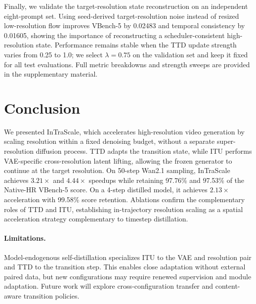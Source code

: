 \documentclass[letterpaper]{article} %
\begin{document}
Finally, we validate the target-resolution state reconstruction on an
independent eight-prompt set. Using seed-derived target-resolution noise
instead of resized low-resolution flow improves VBench-5 by 0.02483 and
temporal consistency by 0.01605, showing the importance of reconstructing a
scheduler-consistent high-resolution state. Performance remains stable when
the TTD update strength varies from 0.25 to 1.0; we select
\(\lambda=0.75\) on the validation set and keep it fixed for all test
evaluations. Full metric breakdowns and strength sweeps are provided in the
supplementary material.

\section{Conclusion}

We presented InTraScale, which accelerates high-resolution video generation
by scaling resolution within a fixed denoising budget, without a separate
super-resolution diffusion process. TTD adapts the transition state, while
ITU performs VAE-specific cross-resolution latent lifting, allowing the
frozen generator to continue at the target resolution. On 50-step
Wan2.1 sampling, InTraScale achieves \(3.21\times\) and \(4.44\times\)
speedups while retaining 97.76\% and 97.53\% of the Native-HR
VBench-5 score. On a 4-step distilled model, it achieves
\(2.13\times\) acceleration with 99.58\% score retention. Ablations confirm
the complementary roles of TTD and ITU, establishing in-trajectory resolution
scaling as a spatial acceleration strategy complementary to timestep
distillation.

\paragraph{Limitations.}
Model-endogenous self-distillation specializes ITU to the VAE and resolution
pair and TTD to the transition step. This enables close adaptation
without external paired data, but new configurations may require renewed
supervision and module adaptation. Future work will explore cross-configuration
transfer and content-aware transition policies.




\end{document}
